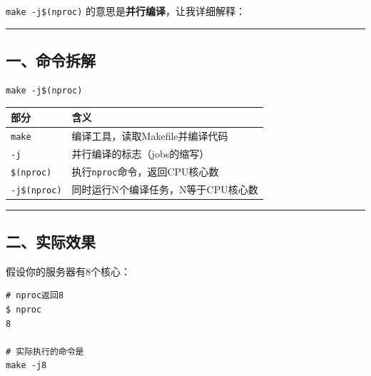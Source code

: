 \documentclass[11pt, a4paper]{article}
\begin{document}
\begin{aibox}
\texttt{make -j\$(nproc)} 的意思是\textbf{并行编译}，让我详细解释：

\begin{center}\rule{\textwidth}{0.4pt}\end{center}

\subsection*{一、命令拆解}

\begin{tcolorbox}[colback=white,colframe=gray!50!white,boxrule=0.5pt,arc=2pt,left=5pt,right=5pt,top=5pt,bottom=5pt]
\begin{verbatim}
make -j$(nproc)
\end{verbatim}
\end{tcolorbox}

\vspace{0.5em}
\begin{tabularx}{\textwidth}{@{} l X @{}}
\toprule
部分 & 含义 \\
\midrule
\texttt{make} & 编译工具，读取Makefile并编译代码 \\
\texttt{-j} & 并行编译的标志（jobs的缩写） \\
\texttt{\$(nproc)} & 执行\texttt{nproc}命令，返回CPU核心数 \\
\texttt{-j\$(nproc)} & 同时运行N个编译任务，N等于CPU核心数 \\
\bottomrule
\end{tabularx}
\vspace{0.5em}

\begin{center}\rule{\textwidth}{0.4pt}\end{center}

\subsection*{二、实际效果}

假设你的服务器有8个核心：

\begin{tcolorbox}[colback=white,colframe=gray!50!white,boxrule=0.5pt,arc=2pt,left=5pt,right=5pt,top=5pt,bottom=5pt]
\begin{verbatim}
# nproc返回8
$ nproc
8

# 实际执行的命令是
make -j8
\end{verbatim}
\end{tcolorbox}


\end{aibox}
\end{document}
